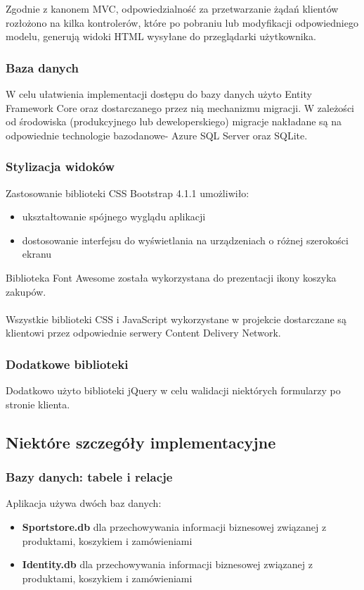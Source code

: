 \documentclass[a4paper,10pt]{article}
\begin{document}
Zgodnie z kanonem MVC, odpowiedzialność za przetwarzanie żądań klientów rozłożono na kilka kontrolerów, które po pobraniu lub modyfikacji odpowiedniego modelu, generują widoki HTML wysyłane do przeglądarki użytkownika.
\subsubsection{Baza danych}
W celu ułatwienia implementacji dostępu do bazy danych użyto Entity Framework Core oraz dostarczanego przez nią mechanizmu migracji.
\newline
W zależości od środowiska (produkcyjnego lub deweloperskiego) migracje nakładane są na odpowiednie technologie bazodanowe- Azure SQL Server oraz SQLite.

\subsubsection{Stylizacja widoków} 
Zastosowanie biblioteki CSS Bootstrap 4.1.1 umożliwiło:
\begin{itemize}
 \item ukształtowanie spójnego wyglądu aplikacji
 \item dostosowanie interfejsu do wyświetlania na urządzeniach o różnej szerokości ekranu
\end{itemize}

Biblioteka Font Awesome została wykorzystana do prezentacji ikony koszyka zakupów.

\paragraph{}
Wszystkie biblioteki CSS i JavaScript wykorzystane w projekcie dostarczane są klientowi przez odpowiednie serwery Content Delivery Network.

\subsubsection{Dodatkowe biblioteki}
Dodatkowo użyto biblioteki jQuery w celu walidacji niektórych formularzy po stronie klienta.

\subsection{Niektóre szczegóły implementacyjne}
\subsubsection{Bazy danych: tabele i relacje}
Aplikacja używa dwóch baz danych: 
\begin{itemize}
 \item \textbf{Sportstore.db} dla przechowywania informacji biznesowej związanej z produktami, koszykiem i zamówieniami
 \item \textbf{Identity.db} dla przechowywania informacji biznesowej związanej z produktami, koszykiem i zamówieniami
\end{itemize}
\end{document}
